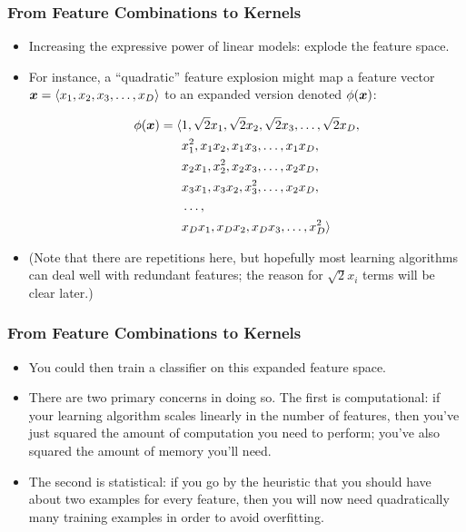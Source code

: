 \documentclass[trans]{beamer}
\begin{document}
\begin{comment}
   - From feature combinations and basis functions to kernels
   - Dot products versus kernels
   - Kernel/dual perceptron
   - Support vector machines
\end{comment}


\begin{frame}
  \frametitle{From Feature Combinations to Kernels}
\begin{itemize}
\item 
Increasing the expressive power of linear models: explode the feature
space. 
\item For instance, a ``quadratic'' feature explosion might map a
feature vector ${\boldsymbol{x}} = \langle x_1, x_2, x_3, \dots, x_D \rangle$ to an
expanded version denoted $\phi({\boldsymbol{x}})$:
%
\begin{scriptsize}
\begin{align}
  \phi({\boldsymbol{x}}) = \langle &1, \sqrt 2x_1,\sqrt 2x_2,\sqrt 2x_3, \dots,\sqrt 2x_D, \nonumber\\
  & x_1^2, x_1 x_2, x_1 x_3, \dots, x_1 x_D, \nonumber\\
  & x_2 x_1, x_2^2, x_2 x_3, \dots, x_2 x_D, \nonumber\\
  & x_3 x_1, x_3 x_2, x_3^2, \dots, x_2 x_D, \nonumber\\
  & \dots, \nonumber\\
  & x_D x_1, x_D x_2, x_D x_3, \dots, x_D^2 \rangle
\end{align}
\end{scriptsize}
%
\item
(Note that there are repetitions here, but hopefully most learning
algorithms can deal well with redundant features; the reason for
$\sqrt 2x_i$ terms will be clear later.)
\end{itemize}
\end{frame}
\begin{frame}
  \frametitle{From Feature Combinations to Kernels}
\begin{itemize}
\item 
You could then train a classifier on this expanded feature space.
\item
There are two primary concerns in doing so.  The first is
computational: if your learning algorithm scales linearly in the
number of features, then you've just squared the amount of computation
you need to perform; you've also squared the amount of memory you'll
need.  
\item The second is statistical: if you go by the heuristic that you
should have about two examples for every feature, then you will now
need quadratically many training examples in order to avoid
overfitting.
\end{itemize}
\end{frame}
\end{document}
